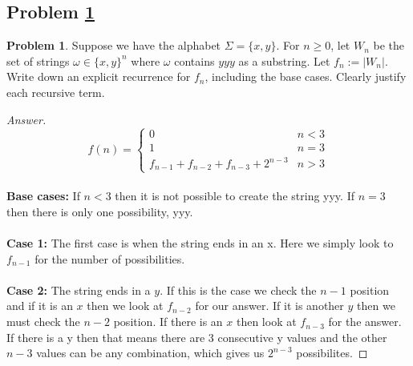 \documentclass[11pt]{article}
\theoremstyle{definition}
\theoremstyle{definition}
\newtheorem{required}{Problem}
\theoremstyle{definition}
\begin{document}

\newpage
\subsection{Problem \ref{DP4}}

\begin{required} \label{DP4}
Suppose we have the alphabet $\Sigma = \{x, y\}$. For $n \geq 0$, let $W_{n}$ be the set of strings $\omega \in \{x, y\}^{n}$ where $\omega$ contains $yyy$ as a substring. Let $f_{n} := |W_{n}|$. Write down an explicit recurrence for $f_{n}$, including the base cases. Clearly justify each recursive term.
\end{required}

\begin{proof}[Answer]
\begin{equation}
  f(n)=\begin{cases}
    0 & n < 3\\
    1 & n=3 \\
    f_{n-1} + f_{n-2} + f_{n-3} + 2^{n-3} & n > 3
  \end{cases}
\end{equation} \\
\textbf{Base cases: }If $n<3$ then it is not possible to create the string yyy. If $n=3$ then there is only one possibility, yyy.  \\ \\
\textbf{Case 1: }The first case is when the string ends in an x. Here we simply look to $f_{n-1}$ for the number of possibilities. \\ \\
\textbf{Case 2:} The string ends in a $y$. If this is the case we check the $n-1$ position and if it is an $x$ then we look at $f_{n-2}$ for our answer. If it is another $y$ then we must check the $n-2$ position. If there is an $x$ then look at $f_{n-3}$ for the answer. If there is a y then that means there are 3 consecutive y values and the other $n-3$ values can be any combination, which gives us $2^{n-3}$ possibilites. 
\end{proof}
\end{document}
